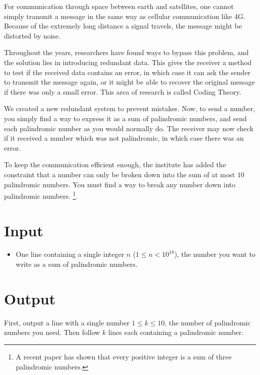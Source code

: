 

\newcommand{\maxa}{10^{18}}
\newcommand{\maxk}{10}

For communication through space between earth and satellites, one cannot simply transmit a message in the same way as cellular communication like 4G. Because of the extremely long distance a signal travels, the message might be distorted by noise. 

Throughout the years, researchers have found ways to bypass this problem, and the solution lies in introducing redundant data. This gives the receiver a method to test if the received data contains an error, in which case it can ask the sender to transmit the message again, or it might be able to recover the original message if there was only a small error. This area of research is called Coding Theory.

We created a new redundant system to prevent mistakes. Now, to send a number, you simply find a way to express it as a sum of palindromic numbers, and send each palindromic number as you would normally do.
The receiver may now check if it received a number which was not palindromic, in which case there was an error.

To keep the communication efficient enough, the institute has added the constraint that a number can only be broken down into the sum of at most $\maxk$ palindromic numbers.
You must find a way to break any number down into palindromic numbers.%
\footnote{A recent paper has shown that every positive integer is a sum of three palindromic numbers.}.

\section*{Input}
	\begin{itemize}
		\item One line containing a single integer $n$ ($1\leq n < \maxa$), the number you want to write as a sum of palindromic numbers.
	\end{itemize}

\section*{Output}
First, output a line with a single number $1\leq k\leq \maxk$, the number of palindromic numbers you need.
Then follow $k$ lines each containing a palindromic number.


